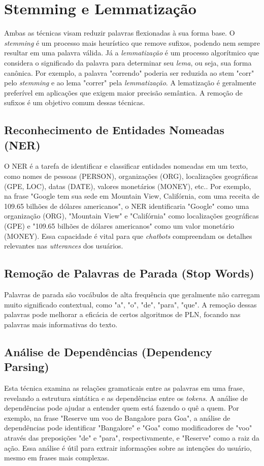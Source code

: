 \documentclass[14pt,a4paper,oneside]{book}
\begin{document}
\section{Stemming e Lemmatização}
Ambas as técnicas visam reduzir palavras flexionadas à sua forma base. O \textit{stemming} é um processo mais heurístico que remove sufixos, podendo nem sempre resultar em uma palavra válida. Já a \textit{lemmatização} é um processo algorítmico que considera o significado da palavra para determinar seu \textit{lema}, ou seja, sua forma canônica. Por exemplo, a palavra "correndo" poderia ser reduzida ao stem "corr" pelo \textit{stemming} e ao lema "correr" pela \textit{lemmatização}. A lematização é geralmente preferível em aplicações que exigem maior precisão semântica. A remoção de sufixos é um objetivo comum dessas técnicas.

\subsection{Reconhecimento de Entidades Nomeadas (NER)}
O NER é a tarefa de identificar e classificar entidades nomeadas em um texto, como nomes de pessoas (PERSON), organizações (ORG), localizações geográficas (GPE, LOC), datas (DATE), valores monetários (MONEY), etc.. Por exemplo, na frase "Google tem sua sede em Mountain View, Califórnia, com uma receita de 109.65 bilhões de dólares americanos", o NER identificaria "Google" como uma organização (ORG), "Mountain View" e "Califórnia" como localizações geográficas (GPE) e "109.65 bilhões de dólares americanos" como um valor monetário (MONEY). Essa capacidade é vital para que \textit{chatbots} compreendam os detalhes relevantes nas \textit{utterances} dos usuários.

\subsection{Remoção de Palavras de Parada (Stop Words)}
Palavras de parada são vocábulos de alta frequência que geralmente não carregam muito significado contextual, como "a", "o", "de", "para", "que". A remoção dessas palavras pode melhorar a eficácia de certos algoritmos de PLN, focando nas palavras mais informativas do texto.

\subsection{Análise de Dependências (Dependency Parsing)}
Esta técnica examina as relações gramaticais entre as palavras em uma frase, revelando a estrutura sintática e as dependências entre os \textit{tokens}. A análise de dependências pode ajudar a entender quem está fazendo o quê a quem. Por exemplo, na frase "Reserve um voo de Bangalore para Goa", a análise de dependências pode identificar "Bangalore" e "Goa" como modificadores de "voo" através das preposições "de" e "para", respectivamente, e "Reserve" como a raiz da ação. Essa análise é útil para extrair informações sobre as intenções do usuário, mesmo em frases mais complexas.
\end{document}
